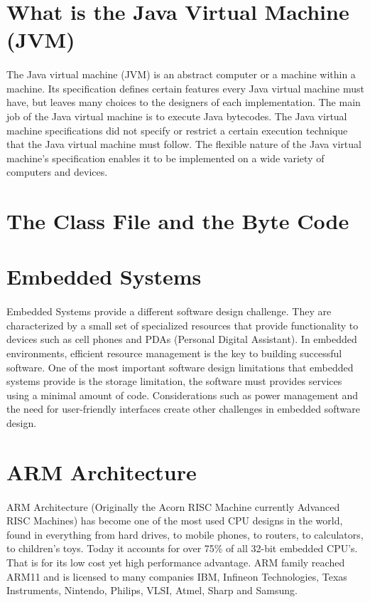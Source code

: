 \section{What is the Java Virtual Machine (JVM)}
\paragraph{}
The Java virtual machine (JVM) is an abstract computer or a machine within a machine. Its specification defines certain features every Java virtual machine must have, but leaves many choices to the designers of each implementation. The main job of the Java virtual machine is to execute Java bytecodes. The Java virtual machine specifications did not specify or restrict a certain execution technique that the Java virtual machine must follow. The flexible nature of the Java virtual machine's specification enables it to be implemented on a wide variety of computers and devices.
\section{The Class File and the Byte Code}%
\section{Embedded Systems}
\paragraph{}
Embedded Systems provide a different software design challenge. They are characterized by a small set of specialized resources that provide functionality to devices such as cell phones and PDAs (Personal Digital Assistant). In embedded environments, efficient resource management is the key to building successful software. One of the most important software design limitations that embedded systems provide is the storage limitation, the software must provides services using a minimal amount of code. Considerations such as power management and the need for user-friendly interfaces create other challenges in embedded software design.
\section{ARM Architecture}
\paragraph{}
ARM Architecture (Originally the Acorn RISC Machine currently Advanced RISC Machines) has become one of the most used CPU designs in the world, found in everything from hard drives, to mobile phones, to routers, to calculators, to children’s toys. Today it accounts for over 75\% of all 32-bit embedded CPU’s. That is for its low cost yet high performance advantage. ARM family reached ARM11 and is licensed to many companies IBM, Infineon Technologies, Texas Instruments, Nintendo, Philips, VLSI, Atmel, Sharp and Samsung.
